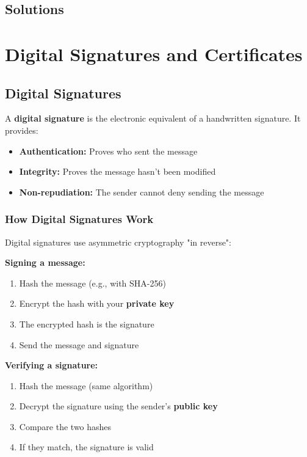 \documentclass[11pt,a4paper]{report}
\begin{document}
\newpage
\section{Solutions}
\printcursols
\newpage
\chapter{Digital Signatures and Certificates}

\section{Digital Signatures}

A \textbf{digital signature} is the electronic equivalent of a handwritten signature. It provides:
\begin{itemize}
\item \textbf{Authentication:} Proves who sent the message
\item \textbf{Integrity:} Proves the message hasn't been modified
\item \textbf{Non-repudiation:} The sender cannot deny sending the message
\end{itemize}

\subsection{How Digital Signatures Work}

Digital signatures use asymmetric cryptography "in reverse":

\textbf{Signing a message:}
\begin{enumerate}
\item Hash the message (e.g., with SHA-256)
\item Encrypt the hash with your \textbf{private key}
\item The encrypted hash is the signature
\item Send the message and signature
\end{enumerate}

\textbf{Verifying a signature:}
\begin{enumerate}
\item Hash the message (same algorithm)
\item Decrypt the signature using the sender's \textbf{public key}
\item Compare the two hashes
\item If they match, the signature is valid
\end{enumerate}
\end{document}
